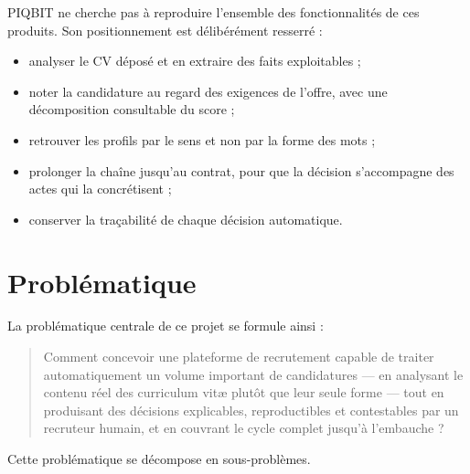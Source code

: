 PIQBIT ne cherche pas à reproduire l'ensemble des fonctionnalités de ces
produits. Son positionnement est délibérément resserré :

\begin{itemize}[leftmargin=*]
  \item analyser le CV déposé et en extraire des faits exploitables ;
  \item noter la candidature au regard des exigences de l'offre, avec une
        décomposition consultable du score ;
  \item retrouver les profils par le sens et non par la forme des mots ;
  \item prolonger la chaîne jusqu'au contrat, pour que la décision
        s'accompagne des actes qui la concrétisent ;
  \item conserver la traçabilité de chaque décision automatique.
\end{itemize}

\section{Problématique}
\label{sec:problem_statement}

La problématique centrale de ce projet se formule ainsi :

\begin{quote}
Comment concevoir une plateforme de recrutement capable de traiter
automatiquement un volume important de candidatures — en analysant le contenu
réel des curriculum vitæ plutôt que leur seule forme — tout en produisant des
décisions explicables, reproductibles et contestables par un recruteur humain,
et en couvrant le cycle complet jusqu'à l'embauche ?
\end{quote}

Cette problématique se décompose en sous-problèmes.


